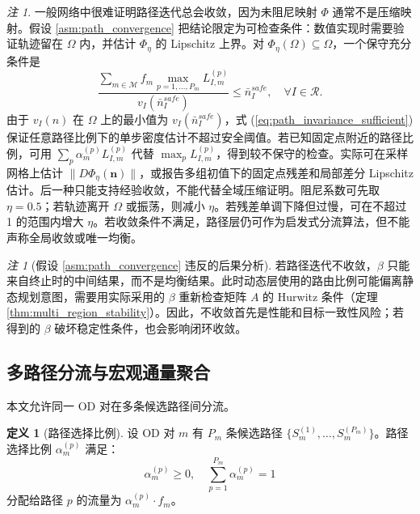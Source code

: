 \documentclass[a4paper,12pt]{article}
\theoremstyle{plain}
\theoremstyle{definition}
\newtheorem{definition}[theorem]{定义}
\theoremstyle{remark}
\newtheorem{remark}[theorem]{注}
\begin{document}
\begin{remark}
一般网络中很难证明路径迭代总会收敛，因为未阻尼映射 $\Phi$ 通常不是压缩映射。假设 \ref{asm:path_convergence} 把结论限定为可检查条件：数值实现时需要验证轨迹留在 $\Omega$ 内，并估计 $\Phi_\eta$ 的 Lipschitz 上界。对 $\Phi_\eta(\Omega)\subseteq\Omega$，一个保守充分条件是
\begin{equation}\label{eq:path_invariance_sufficient}
    \frac{\sum_{m\in\mathcal M} f_m \max_{p=1,\ldots,P_m} L_{I,m}^{(p)}}{v_I(\bar n_I^{safe})}
    \le \bar n_I^{safe},
    \quad \forall I\in\mathcal R .
\end{equation}
由于 $v_I(n)$ 在 $\Omega$ 上的最小值为 $v_I(\bar n_I^{safe})$，式 (\ref{eq:path_invariance_sufficient}) 保证任意路径比例下的单步密度估计不超过安全阈值。若已知固定点附近的路径比例，可用 $\sum_p\alpha_m^{(p)}L_{I,m}^{(p)}$ 代替 $\max_p L_{I,m}^{(p)}$，得到较不保守的检查。实际可在采样网格上估计 $\|D\Phi_\eta(\bm n)\|$，或报告多组初值下的固定点残差和局部差分 Lipschitz 估计。后一种只能支持经验收敛，不能代替全域压缩证明。阻尼系数可先取 $\eta=0.5$；若轨迹离开 $\Omega$ 或振荡，则减小 $\eta$。若残差单调下降但过慢，可在不超过 1 的范围内增大 $\eta$。若收敛条件不满足，路径层仍可作为启发式分流算法，但不能声称全局收敛或唯一均衡。
\end{remark}

\begin{remark}[假设 \ref{asm:path_convergence} 违反的后果分析]\label{rem:path_nonconvergence}
若路径迭代不收敛，$\beta$ 只能来自终止时的中间结果，而不是均衡结果。此时动态层使用的路由比例可能偏离静态规划意图，需要用实际采用的 $\beta$ 重新检查矩阵 $A$ 的 Hurwitz 条件（定理 \ref{thm:multi_region_stability}）。因此，不收敛首先是性能和目标一致性风险；若得到的 $\beta$ 破坏稳定性条件，也会影响闭环收敛。
\end{remark}

\subsection{多路径分流与宏观通量聚合}

本文允许同一 OD 对在多条候选路径间分流。

\begin{definition}[路径选择比例]\label{def:path_split}
设 OD 对 $m$ 有 $P_m$ 条候选路径 $\{S_m^{(1)}, \dots, S_m^{(P_m)}\}$。路径选择比例 $\alpha_m^{(p)}$ 满足：
\begin{equation}
    \alpha_m^{(p)} \ge 0, \quad \sum_{p=1}^{P_m} \alpha_m^{(p)} = 1
\end{equation}
分配给路径 $p$ 的流量为 $\alpha_m^{(p)} \cdot f_m$。
\end{definition}
\end{document}
